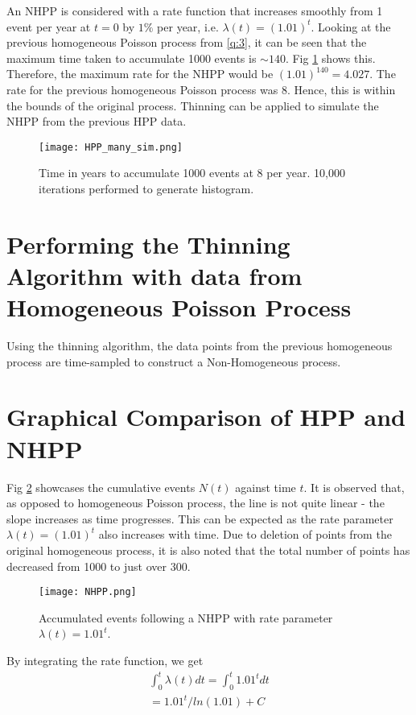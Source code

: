 \documentclass[%
 reprint,
 amsmath,amssymb,
 aps,
]{revtex4-2}
\theoremstyle{definition}
\begin{document}
An NHPP is considered with a rate function that increases smoothly from 1 event per year at $t = 0$ by $1\%$ per year, i.e. $\lambda(t) = (1.01)^t$. Looking at the previous homogeneous Poisson process from \ref{q:3}, it can be seen that the maximum time taken to accumulate 1000 events is $\sim140$. Fig \ref{fig:hpp_many_sim} shows this. Therefore, the maximum rate for the NHPP would be $(1.01)^{140} = 4.027$. The rate for the previous homogeneous Poisson process was 8. Hence, this is within the bounds of the original process. Thinning can be applied to simulate the NHPP from the previous HPP data.

\begin{figure}
\centering
\texttt{[image: HPP\_many\_sim.png]}
\caption{\label{fig:hpp_many_sim}Time in years to accumulate 1000 events at 8 per year. 10,000 iterations performed to generate histogram.}
\end{figure}

\section{\label{q:5}Performing the Thinning Algorithm with data from Homogeneous Poisson Process}
Using the thinning algorithm, the data points from the previous homogeneous process are time-sampled to construct a Non-Homogeneous process. 

\section{\label{q:6}Graphical Comparison of HPP and NHPP}
Fig \ref{fig:nhpp} showcases the cumulative events $N(t)$ against time $t$. It is observed that, as opposed to homogeneous Poisson process, the line is not quite linear - the slope increases as time progresses. This can be expected as the rate parameter $\lambda(t) = (1.01)^t$ also increases with time. Due to deletion of points from the original homogeneous process, it is also noted that the total number of points has decreased from 1000 to just over 300.

\begin{figure}
\centering
\texttt{[image: NHPP.png]}
\caption{\label{fig:nhpp}Accumulated events following a NHPP with rate parameter $\lambda(t) = 1.01^t$.}
\end{figure}

By integrating the rate function, we get 
\begin{gather*}
\int_{0}^{t}\lambda(t)dt = \int_{0}^{t}1.01^tdt\\
=1.01^t/ln(1.01) + C
\end{gather*}
\end{document}
